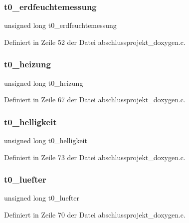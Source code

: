 \subsubsection{t0\+\_\+erdfeuchtemessung}
{\footnotesize\ttfamily unsigned long t0\+\_\+erdfeuchtemessung}



Definiert in Zeile 52 der Datei abschlussprojekt\+\_\+doxygen.\+c.

\mbox{\label{abschlussprojekt__doxygen_8c_a9ca81fb931b2eb83f3a822a49df8995f}} 
\subsubsection{t0\+\_\+heizung}
{\footnotesize\ttfamily unsigned long t0\+\_\+heizung}



Definiert in Zeile 67 der Datei abschlussprojekt\+\_\+doxygen.\+c.

\mbox{\label{abschlussprojekt__doxygen_8c_ab55c3f7b2994108f2af60557f2c801d2}} 
\subsubsection{t0\+\_\+helligkeit}
{\footnotesize\ttfamily unsigned long t0\+\_\+helligkeit}



Definiert in Zeile 73 der Datei abschlussprojekt\+\_\+doxygen.\+c.

\mbox{\label{abschlussprojekt__doxygen_8c_a1cc8e9a2f7e21352f0f123728881ad62}} 
\subsubsection{t0\+\_\+luefter}
{\footnotesize\ttfamily unsigned long t0\+\_\+luefter}



Definiert in Zeile 70 der Datei abschlussprojekt\+\_\+doxygen.\+c.

